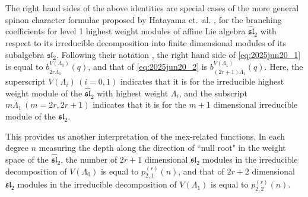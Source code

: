 \documentclass[sn-mathphys-num]{sn-jnl}%
\newcommand{\red}[1]{\textcolor{black}{#1}}
\theoremstyle{thmstyleone}%
\theoremstyle{thmstyletwo}%
\theoremstyle{thmstylethree}%
\begin{document}
\begin{appendices}
The right hand sides of the above identities are special cases of
the more general spinon character formulae proposed by Hatayama et.~al. \cite[(5.49)]{HKKOTY},
for the branching coefficients for level 1 highest weight modules of
affine Lie algebra \red{$\widehat{\mathfrak{sl}}_2$} with respect to its irreducible decomposition into
finite dimensional modules of its subalgebra \red{$\mathfrak{sl}_2$}.
Following their notation \cite{HKKOTY}, 
the right hand side of \eqref{eq:2025jun20_1} is equal to
$b^{V(\Lambda_0)}_{2r \overline{\Lambda}_1}(q)$, and that of
\eqref{eq:2025jun20_2} is
$b^{V(\Lambda_1)}_{(2r+1) \overline{\Lambda}_1} (q)$.
Here, the superscript $V(\Lambda_i) \, (i=0,1)$ indicates that it is for
the irreducible highest weight module of the \red{$\widehat{\mathfrak{sl}}_2$} with highest weight $\Lambda_i$, and
the subscript $m \overline{\Lambda}_1 \, (m=2r, 2r+1)$ indicates
that it is for the $m+1$ dimensional irreducible module of the \red{$\mathfrak{sl}_2$}.

This provides us another interpretation of the mex-related functions.
In each degree $n$ measuring the depth along the direction of ``null root"
in the weight space of the \red{$\widehat{\mathfrak{sl}}_2$},
the number of $2r+1$ dimensional \red{$\mathfrak{sl}_2$} modules in the irreducible decomposition of
$V(\Lambda_0)$ is
equal to $p^{(r)}_{2,1}(n)$, and that of $2r+2$ dimensional \red{$\mathfrak{sl}_2$} modules in the irreducible decomposition of $V(\Lambda_1)$ is equal to $p^{(r)}_{2,2}(n)$.


\end{appendices}
\end{document}
